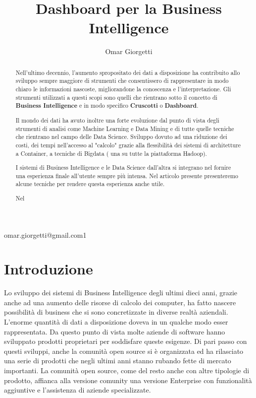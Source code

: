 \documentclass{ium}
\begin{document}
 
\title{Dashboard per la Business Intelligence}
\author{Omar Giorgetti}{omar.giorgetti@gmail.com}{1}
\markboth{{}}{} 
\markright{\thesection\ {}}
\begin{abstract}

Nell'ultimo decennio, l'aumento spropositato dei dati a disposizione ha contribuito allo sviluppo sempre maggiore di strumenti che consentissero di rappresentare in modo chiaro le informazioni nascoste, migliorandone la conoscenza e l'interpretazione.
Gli strumenti utilizzati a questi scopi sono quelli che rientrano sotto il concetto di \textbf{Business Intelligence} e in modo specifico \textbf{Cruscotti} o \textbf{Dashboard}.

Il mondo dei dati ha avuto inoltre una forte evoluzione dal punto di vista degli strumenti di analisi come Machine Learning e Data Mining e di tutte quelle tecniche che rientrano nel campo delle Data Science. Sviluppo dovuto ad una riduzione dei costi, dei tempi nell'accesso al "calcolo" grazie alla flessibilità dei sistemi di architetture a Container, a tecniche di Bigdata ( una su tutte la piattaforma Hadoop). 

I sistemi di Business Intelligence e le Data Science dall'altra si integrano nel fornire una esperienza finale all'utente sempre più intensa. Nel articolo presente presenteremo alcune tecniche per rendere questa esperienza anche utile.

Nel

\end{abstract}


%
%


\section{Introduzione}

Lo sviluppo dei sistemi di Business Intelligence degli ultimi dieci anni, grazie anche ad una aumento delle risorse di calcolo dei computer, ha fatto nascere possibilità di business che si sono concretizzate in diverse realtà aziendali. L'enorme quantità di dati a disposizione doveva in un qualche modo esser rappresentata. Da questo punto di vista molte aziende di software hanno sviluppato prodotti proprietari per soddisfare queste esigenze. Di pari passo con questi sviluppi, anche la comunità open source si è organizzata ed ha rilasciato una serie di prodotti che negli ultimi anni stanno rubando fette di mercato importanti. La comunità open source, come del resto anche con altre tipologie di prodotto, affianca alla versione comunity una versione Enterprise con funzionalità aggiuntive e l'assistenza di aziende specializzate.
\end{document}
